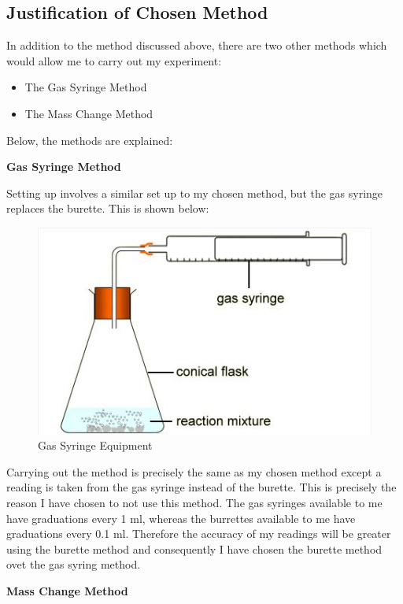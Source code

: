 	\subsection{Justification of Chosen Method}

In addition to the method discussed above, there are two other methods which would allow me to carry out my experiment:
\begin{itemize}
\item The Gas Syringe Method
\item The Mass Change Method 
\end{itemize}

Below, the methods are explained:

\textbf{Gas Syringe Method}



Setting up involves a similar set up to my chosen method, but the gas syringe replaces the burette. This is shown below:
\begin{figure}[H]
    \includegraphics[width=\textwidth]{./Planning/Images/GasSyringe.jpg}
    \caption{Gas Syringe Equipment} \label{fig:Gas Syringe}
\end{figure}

Carrying out the method is precisely the same as my chosen method except a reading is taken from the gas syringe instead of the burette. This is precisely the reason I have chosen to not use this method. The gas syringes available to me have graduations every 1 ml, whereas the burrettes available to me have graduations every 0.1 ml. Therefore the accuracy of my readings will be greater using the burette method and consequently I have chosen the burette method ovet the gas syring method. 

\textbf{Mass Change Method}

